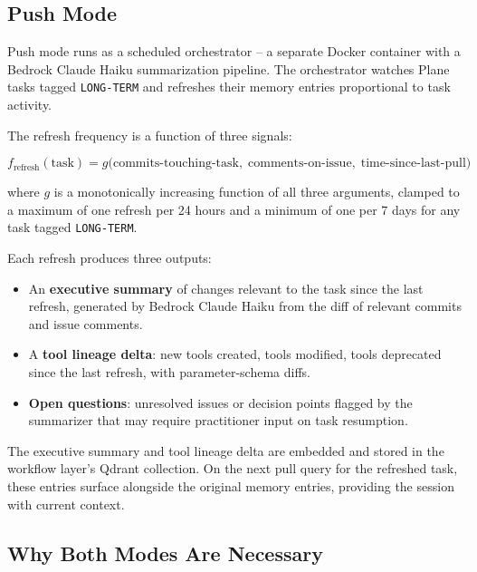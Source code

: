 \documentclass[11pt]{article}
\begin{document}
\subsection{Push Mode}
\label{sec:push-mode}

Push mode runs as a scheduled orchestrator -- a separate Docker container with a Bedrock Claude Haiku summarization pipeline.
The orchestrator watches Plane tasks tagged \texttt{LONG-TERM} and refreshes their memory entries proportional to task activity.

The refresh frequency is a function of three signals:

\begin{equation}
  f_{\text{refresh}}(\text{task}) = g\bigl(
    \text{commits-touching-task},\;
    \text{comments-on-issue},\;
    \text{time-since-last-pull}
  \bigr)
  \label{eq:refresh}
\end{equation}

\noindent where $g$ is a monotonically increasing function of all three arguments, clamped to a maximum of one refresh per 24 hours and a minimum of one per 7 days for any task tagged \texttt{LONG-TERM}.

Each refresh produces three outputs:
\begin{itemize}[leftmargin=*, nosep]
  \item An \textbf{executive summary} of changes relevant to the task since the last refresh, generated by Bedrock Claude Haiku from the diff of relevant commits and issue comments.
  \item A \textbf{tool lineage delta}: new tools created, tools modified, tools deprecated since the last refresh, with parameter-schema diffs.
  \item \textbf{Open questions}: unresolved issues or decision points flagged by the summarizer that may require practitioner input on task resumption.
\end{itemize}

The executive summary and tool lineage delta are embedded and stored in the workflow layer's Qdrant collection.
On the next pull query for the refreshed task, these entries surface alongside the original memory entries, providing the session with current context.

\subsection{Why Both Modes Are Necessary}
\label{sec:why-both}
\end{document}
